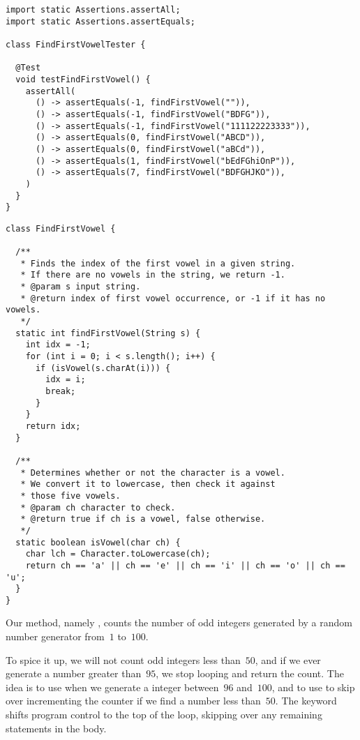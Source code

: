 \begin{lstlisting}[language=MyJava]
import static Assertions.assertAll;
import static Assertions.assertEquals;

class FindFirstVowelTester {

  @Test
  void testFindFirstVowel() {
    assertAll(
      () -> assertEquals(-1, findFirstVowel("")),
      () -> assertEquals(-1, findFirstVowel("BDFG")),
      () -> assertEquals(-1, findFirstVowel("111122223333")),
      () -> assertEquals(0, findFirstVowel("ABCD")),
      () -> assertEquals(0, findFirstVowel("aBCd")),
      () -> assertEquals(1, findFirstVowel("bEdFGhiOnP")),
      () -> assertEquals(7, findFirstVowel("BDFGHJKO")),
    )
  }
}
\end{lstlisting}

\newpage %
\begin{lstlisting}[language=MyJava]
class FindFirstVowel {

  /**
   * Finds the index of the first vowel in a given string. 
   * If there are no vowels in the string, we return -1.
   * @param s input string.
   * @return index of first vowel occurrence, or -1 if it has no vowels.
   */
  static int findFirstVowel(String s) {
    int idx = -1;
    for (int i = 0; i < s.length(); i++) {
      if (isVowel(s.charAt(i))) {
        idx = i;
        break;
      }
    }
    return idx;
  }

  /**
   * Determines whether or not the character is a vowel. 
   * We convert it to lowercase, then check it against 
   * those five vowels.
   * @param ch character to check.
   * @return true if ch is a vowel, false otherwise.
   */
  static boolean isVowel(char ch) {
    char lch = Character.toLowercase(ch);
    return ch == 'a' || ch == 'e' || ch == 'i' || ch == 'o' || ch == 'u';
  }
}
\end{lstlisting}

Our method, namely , counts the number of odd integers generated by a random number generator from~$1$ to~$100$. 

To spice it up, we will not count odd integers less than~$50$, and if we ever generate a number greater than~$95$, we stop looping and return the count. 
The idea is to use  when we generate a integer between~$96$ and~$100$, and to use  to skip over incrementing the counter if we find a number less than~$50$. 
The  keyword shifts program control to the top of the loop, skipping over any remaining statements in the body. 

